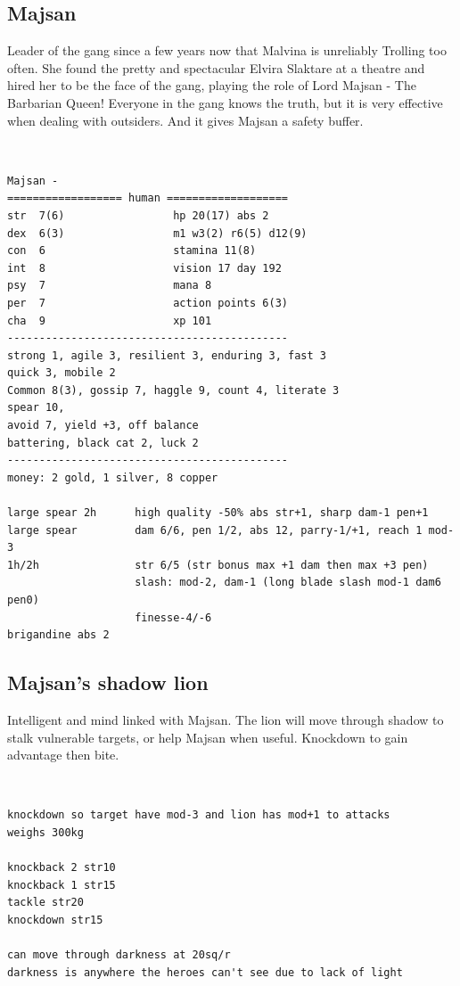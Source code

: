 \clearpage
\begin{samepage}
\subsection*{Majsan}
Leader of the gang since a few years now that Malvina is unreliably Trolling too often. She found the pretty and spectacular Elvira Slaktare at a theatre and hired her to be the face of the gang, playing the role of Lord Majsan - The Barbarian Queen!
Everyone in the gang knows the truth, but it is very effective when dealing with outsiders. And it gives Majsan a safety buffer.

\

\small \begin{verbatim}
Majsan -
================== human ===================
str  7(6)                 hp 20(17) abs 2
dex  6(3)                 m1 w3(2) r6(5) d12(9)
con  6                    stamina 11(8)
int  8                    vision 17 day 192
psy  7                    mana 8
per  7                    action points 6(3)
cha  9                    xp 101
--------------------------------------------
strong 1, agile 3, resilient 3, enduring 3, fast 3
quick 3, mobile 2
Common 8(3), gossip 7, haggle 9, count 4, literate 3
spear 10,
avoid 7, yield +3, off balance
battering, black cat 2, luck 2
--------------------------------------------
money: 2 gold, 1 silver, 8 copper

large spear 2h      high quality -50% abs str+1, sharp dam-1 pen+1
large spear         dam 6/6, pen 1/2, abs 12, parry-1/+1, reach 1 mod-3
1h/2h               str 6/5 (str bonus max +1 dam then max +3 pen)
                    slash: mod-2, dam-1 (long blade slash mod-1 dam6 pen0)
                    finesse-4/-6
brigandine abs 2
\end{verbatim} \normalsize
\end{samepage}


\begin{samepage}
\subsection*{Majsan's shadow lion}
Intelligent and mind linked with Majsan. The lion will move through shadow to stalk vulnerable targets, or help Majsan when useful. Knockdown to gain advantage then bite.

\

\small \begin{verbatim}
knockdown so target have mod-3 and lion has mod+1 to attacks
weighs 300kg

knockback 2 str10
knockback 1 str15
tackle str20
knockdown str15

can move through darkness at 20sq/r
darkness is anywhere the heroes can't see due to lack of light
\end{verbatim} \normalsize
\end{samepage}









